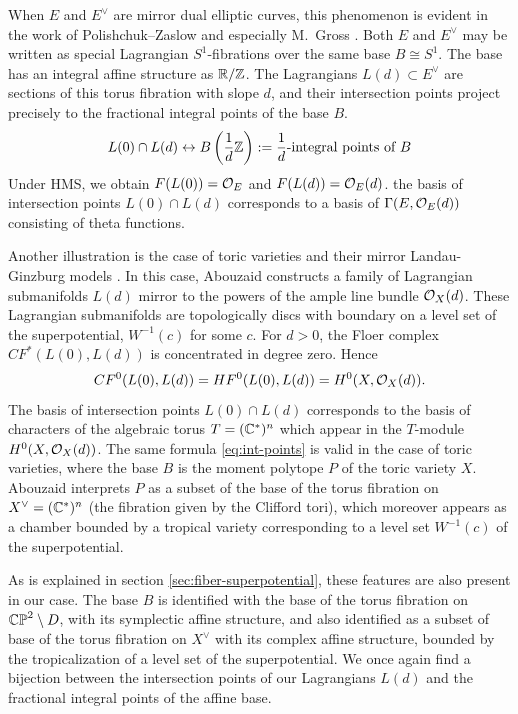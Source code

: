 \documentclass[12pt]{amsart}
\begin{document}
When $E$ and $E^\vee$ are mirror dual elliptic curves, this phenomenon
is evident in the work of Polishchuk--Zaslow \cite{polishchuk-zaslow}
and especially M.~Gross \cite[Ch.~8]{d-branes-book}. Both $E$ and
$E^\vee$ may be written as special Lagrangian $S^1$-fibrations over
the same base $B \cong S^1$. The base has an integral affine structure
as $\mathbb{R}/\mathbb{Z}$. The Lagrangians $L(d) \subset E^\vee$ are sections of this
torus fibration with slope $d$, and their intersection points project
precisely to the fractional integral points of the base $B$.
\begin{equation}
  \label{eq:int-points}
  L(0) \cap L(d) \leftrightarrow B\left(\frac{1}{d}\mathbb{Z}\right) :=
  \frac{1}{d} \text{-integral points of } B
\end{equation}
Under HMS, we obtain $F(L(0)) = \mathcal{O}_E$ and $F(L(d)) = \mathcal{O}_E(d)$. the
basis of intersection points $L(0)\cap L(d)$ corresponds to a basis of
$\Gamma(E,\mathcal{O}_E(d))$ consisting of theta functions.

Another illustration is the case of toric varieties and their mirror
Landau-Ginzburg models \cite{abouzaid06,abouzaid09}. In this case,
Abouzaid constructs a family of Lagrangian submanifolds $L(d)$ mirror
to the powers of the ample line bundle $\mathcal{O}_X(d)$. These Lagrangian
submanifolds are topologically discs with boundary on a level set of
the superpotential, $W^{-1}(c)$ for some $c$. For $d>0$, the Floer
complex $CF^*(L(0),L(d))$ is concentrated in degree zero. Hence
\begin{equation}
  CF^0(L(0),L(d)) = HF^0(L(0),L(d)) = H^0(X,\mathcal{O}_X(d)).
\end{equation}
The basis of intersection points $L(0)\cap L(d)$ corresponds to the
basis of characters of the algebraic torus $T = (\mathbb{C}^*)^n$ which appear
in the $T$-module $H^0(X,\mathcal{O}_X(d))$. The same formula
\eqref{eq:int-points} is valid in the case of toric varieties, where
the base $B$ is the moment polytope $P$ of the toric variety
$X$. Abouzaid interprets $P$ as a subset of the base of the torus
fibration on $X^\vee = (\mathbb{C}^*)^n$ (the fibration given by the Clifford
tori), which moreover appears as a chamber bounded by a tropical
variety corresponding to a level set $W^{-1}(c)$ of the
superpotential. 

As is explained in section \ref{sec:fiber-superpotential}, these
features are also present in our case. The base $B$ is identified with
the base of the torus fibration on $\mathbb{CP}^2\setminus D$, with its
symplectic affine structure, and also identified as a subset of base
of the torus fibration on $X^\vee$ with its complex affine structure,
bounded by the tropicalization of a level set of the superpotential. We once again find a bijection between the intersection points of our Lagrangians $L(d)$ and the fractional integral points of the affine base.
\end{document}
